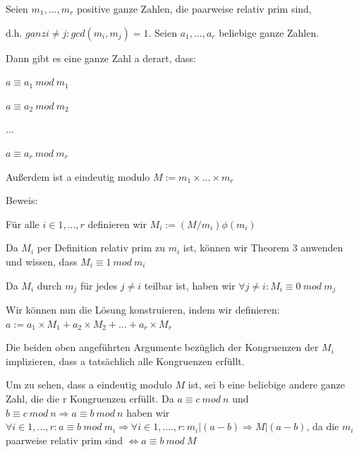 \documentclass[a4paper]{article}
\begin{document}
\begin{multicols}{3}
\begin{itemize*}
            \begin{itemize*}
                  \item Seien $m_1,...,m_r$ positive ganze Zahlen, die paarweise relativ prim sind,
                  \item d.h. $ganz i\not= j:gcd(m_i, m_j) = 1$. Seien $a_1,...,a_r$ beliebige ganze Zahlen.
                  \item Dann gibt es eine ganze Zahl a derart, dass:
                  \begin{itemize*}
                        \item $a\equiv a_1\ mod\ m_1$
                        \item $a\equiv a_2\ mod\ m_2$
                        \item ...
                        \item $a\equiv a_r\ mod\ m_r$
                  \end{itemize*}
                  \item Außerdem ist a eindeutig modulo $M := m_1\times ...\times m_r$
                  \item Beweis:
                  \begin{itemize*}
                        \item Für alle $i\in{1,...,r}$ definieren wir $M_i:=(M/m_i)\phi(m_i)$
                        \item Da $M_i$ per Definition relativ prim zu $m_i$ ist, können wir Theorem 3 anwenden und wissen, dass $M_i\equiv 1\ mod\ m_i$
                        \item Da $M_i$ durch $m_j$ für jedes $j\not= i$ teilbar ist, haben wir $\forall j\not= i:M_i\equiv 0\ mod\ m_j$ \item Wir können nun die Lösung konstruieren, indem wir definieren: $a:= a_1\times M_1+a_2\times M_2+...+a_r\times M_r$
                        \item Die beiden oben angeführten Argumente bezüglich der Kongruenzen der $M_i$ implizieren, dass a tatsächlich alle Kongruenzen erfüllt.
                        \item Um zu sehen, dass a eindeutig modulo $M$ ist, sei b eine beliebige andere ganze Zahl, die die r Kongruenzen erfüllt. Da $a\equiv c\ mod\ n$ und $b\equiv c\ mod\ n \Rightarrow a \equiv b\ mod\ n$ haben wir $\forall i\in{1,...,r}:a\equiv b\ mod\ m_i\Rightarrow\forall i\in{1,. ...,r}:m_i|(a-b) \Rightarrow M|(a-b)$, da die $m_i$ paarweise relativ prim sind $\Leftrightarrow a\equiv b\ mod\ M$
                  \end{itemize*}

\end{itemize*}
\end{itemize*}
\end{multicols}
\end{document}
